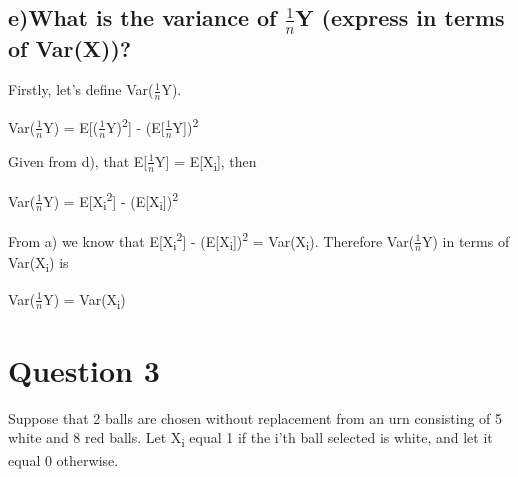 \documentclass{report}
\begin{document}
		
		\subsection*{e)What is the variance of $\frac{1}{n}$Y (express in terms of Var(X))?}
		Firstly, let's define Var($\frac{1}{n}$Y).
		\begin{center}
			Var($\frac{1}{n}$Y) = E[($\frac{1}{n}$Y)\textsuperscript{2}] - (E[$\frac{1}{n}$Y])\textsuperscript{2}
		\end{center}
		Given from d), that E[$\frac{1}{n}$Y] = E[X\textsubscript{i}], then
		\begin{center}
			Var($\frac{1}{n}$Y) = E[X\textsubscript{i}\textsuperscript{2}] - (E[X\textsubscript{i}])\textsuperscript{2}
		\end{center}
		From a) we know that E[X\textsubscript{i}\textsuperscript{2}] - (E[X\textsubscript{i}])\textsuperscript{2} = Var(X\textsubscript{i}).
		Therefore Var($\frac{1}{n}$Y) in terms of Var(X\textsubscript{i}) is
		\begin{center}
			Var($\frac{1}{n}$Y) = Var(X\textsubscript{i})
		\end{center}
		
		
		
		
		
		
		
		
		
		
		
		\section*{\hfil Question 3 \hfil}
		Suppose that 2 balls are chosen without replacement from an urn consisting of 5 white and 8 red balls. Let X\textsubscript{i} equal 1 if the i’th ball selected is white, and let it equal
		0 otherwise.
		
\end{document}
